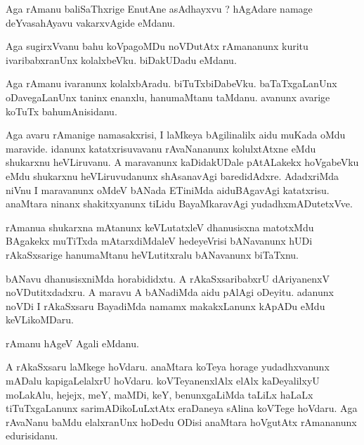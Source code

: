 \documentclass{article}
\begin{document}
\begin{mn}
Aga  rAmanu  baliSaThxrige  EnutAne  asAdhayxvu ?  hAgAdare  namage  deYvasahAyavu  vakarxvAgide  eMdanu.
\end{mn}

\begin{mn}
Aga  sugirxVvanu  bahu  koVpagoMDu  noVDutAtx  rAmananunx  kuritu  ivaribabxranUnx  kolalxbeVku.  biDakUDadu  eMdanu.  
\end{mn}

\begin{mn}
Aga  rAmanu  ivaranunx  kolalxbAradu.  biTuTxbiDabeVku.  baTaTxgaLanUnx  oDavegaLanUnx  taninx  enanxlu,  hanumaMtanu  taMdanu.  
avanunx  avarige  koTuTx  bahumAnisidanu.
\end{mn}

\begin{mn}
Aga  avaru  rAmanige  namasakxrisi,  I  laMkeya  bAgilinalilx  aidu  muKada  oMdu  maravide.  idanunx  katatxrisuvavanu  rAvaNananunx  
kolulxtAtxne  eMdu  shukarxnu  heVLiruvanu.  A  maravanunx  kaDidakUDale  pAtALakekx  hoVgabeVku  eMdu  shukarxnu  heVLiruvudanunx  
shAsanavAgi  baredidAdxre.  AdadxriMda  niVnu  I  maravanunx  oMdeV  bANada  ETiniMda  aiduBAgavAgi  katatxrisu.  anaMtara  ninanx  
shakitxyanunx  tiLidu  BayaMkaravAgi  yudadhxmADutetxVve.
\end{mn}

\begin{mn}
rAmanua  shukarxna  mAtanunx  keVLutatxleV  dhanusisxna  matotxMdu  BAgakekx  muTiTxda  mAtarxdiMdaleV  hedeyeVrisi  bANavanunx  hUDi  
rAkaSxsarige  hanumaMtanu  heVLutitxralu  bANavanunx  biTaTxnu.
\end{mn}

\begin{mn}
bANavu  dhanusisxniMda  horabididxtu.  A  rAkaSxsaribabxrU  dAriyanenxV  noVDutitxdadxru.  A  maravu  A  bANadiMda  aidu  pAlAgi  
oDeyitu.  adanunx  noVDi  I  rAkaSxsaru  BayadiMda  namamx  makakxLanunx  kApADu  eMdu  keVLikoMDaru.
\end{mn}

\begin{mn}
rAmanu  hAgeV  Agali  eMdanu.
\end{mn}

\begin{mn}
A  rAkaSxsaru  laMkege  hoVdaru.  anaMtara  koTeya  horage  yudadhxvanunx  mADalu  kapigaLelalxrU  hoVdaru.  koVTeyanenxlAlx  
elAlx  kaDeyalilxyU  moLakAlu,  hejejx,  meY,  maMDi,  keY,  benunxgaLiMda  taLiLx  haLaLx  tiTuTxgaLanunx  sarimADikoLuLxtAtx  
eraDaneya  sAlina  koVTege  hoVdaru.  Aga  rAvaNanu  baMdu  elalxranUnx  hoDedu  ODisi  anaMtara  hoVgutAtx  rAmananunx  edurisidanu.
\end{mn}
\end{document}
